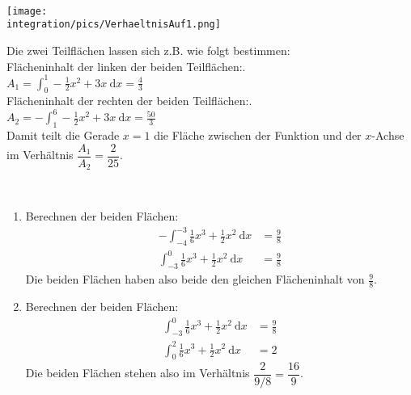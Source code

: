 \documentclass[a4paper,12pt, headsepline, ngerman]{scrartcl}
\theoremstyle{definition}
\newcommand{\td}{\ \text{d}}
\begin{document}
\begin{Answer}[ref=verhaltnisFlaechenA1]\\
\begin{minipage}{\textwidth}
	\begin{minipage}{.4\textwidth}
		\texttt{[image: \\integration/pics/VerhaeltnisAuf1.png]}
	\end{minipage}
	\begin{minipage}{.6\textwidth}\raggedright
		Die zwei Teilflächen lassen sich z.B. wie folgt bestimmen:\\
		Flächeninhalt der linken der beiden Teilflächen:.\\
		\(\displaystyle A_1=\int_{0}^1 -\frac{1}{2}x^2+3x \td x=\frac{4}{3}\)\\
		Flächeninhalt der rechten der beiden Teilflächen:.\\
		\(\displaystyle A_2=-\int_1^6 -\frac{1}{2}x^2+3x \td x=\frac{50}{3}\)\\
		Damit teilt die Gerade \(x=1\) die Fläche zwischen der Funktion und der \(x\)-Achse im Verhältnis \(\dfrac{A_1}{A_2}=\dfrac{2}{25}\).\\
	\end{minipage}
\end{minipage}
\end{Answer}
\begin{Answer}[ref=verhaltnisFlaechenA2]\\
\begin{enumerate}[label=\alph*)]
	\item Berechnen der beiden Flächen:
	\begin{align*}
		-\int_{-4}^{-3}\frac{1}{6}x^3+\frac{1}{2}x^2 \td x&=\frac{9}{8}\\
		\int_{-3}^{0}\frac{1}{6}x^3+\frac{1}{2}x^2 \td x&=\frac{9}{8}
	\end{align*}
	Die beiden Flächen haben also beide den gleichen Flächeninhalt von \(\frac{9}{8}\).
	\item Berechnen der beiden Flächen:
	\begin{align*}
		\int_{-3}^{0}\frac{1}{6}x^3+\frac{1}{2}x^2 \td x&=\frac{9}{8}\\		
		\int_{0}^{2}\frac{1}{6}x^3+\frac{1}{2}x^2 \td x&=2
	\end{align*}
	Die beiden Flächen stehen also im Verhältnis \(\dfrac{2}{9/8}=\dfrac{16}{9}\).	
\end{enumerate}
\end{Answer}
\end{document}
